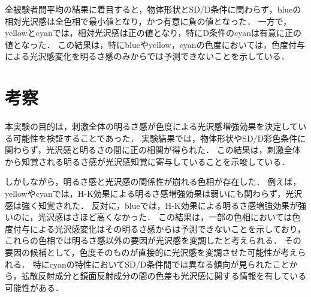             全被験者間平均の結果に着目すると，物体形状とSD/D条件に関わらず，blueの相対光沢感は全色相で最小値となり，かつ有意に負の値となった．
            一方で，yellowとcyanでは，相対光沢感は正の値となり，特にD条件のcyanは有意に正の値となった．
            この結果は，特にblueやyellow，cyanの色度においては，色度付与による光沢感変化を明るさ感のみからでは予測できないことを示している．


        \section{考察}
        
            本実験の目的は，刺激全体の明るさ感が色度による光沢感増強効果を決定している可能性を検証することであった．
            実験結果では，物体形状やSD/D彩色条件に関わらず，光沢感と明るさの間に正の相関が得られた．
            この結果は，刺激全体から知覚される明るさ感が光沢感知覚に寄与していることを示唆している．

            しかしながら，明るさ感と光沢感の関係性が崩れる色相が存在した．
            例えば，yellowやcyanでは，H-K効果による明るさ感増強効果は弱いにも関わらず，光沢感は強く知覚された．
            反対に，blueでは，H-K効果による明るさ感増強効果が強いのに，光沢感はさほど高くなかった．
            この結果は，一部の色相においては色度付与による光沢感変化はその明るさ感からは予測できないことを示しており，これらの色相では明るさ感以外の要因が光沢感を変調したと考えられる．
            その要因の候補として，色度そのものが直接的に光沢感を変調させた可能性が考えられる．
            特にcyanの特性においてSD/D条件間では異なる傾向が見られたことから，拡散反射成分と鏡面反射成分の間の色差も光沢感に関する情報を有している可能性がある．

    \newpage